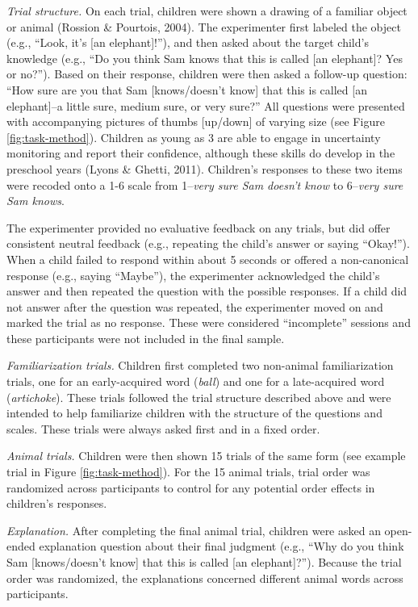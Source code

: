 \documentclass[10pt, letterpaper]{article}
\begin{document}
\emph{Trial structure.} On each trial, children were shown a drawing of
a familiar object or animal (Rossion \& Pourtois, 2004). The
experimenter first labeled the object (e.g., ``Look, it's {[}an
elephant{]}!''), and then asked about the target child's knowledge
(e.g., ``Do you think Sam knows that this is called {[}an elephant{]}?
Yes or no?''). Based on their response, children were then asked a
follow-up question: ``How sure are you that Sam {[}knows/doesn't know{]}
that this is called {[}an elephant{]}--a little sure, medium sure, or
very sure?'' All questions were presented with accompanying pictures of
thumbs {[}up/down{]} of varying size (see Figure \ref{fig:task-method}).
Children as young as 3 are able to engage in uncertainty monitoring and
report their confidence, although these skills do develop in the
preschool years (Lyons \& Ghetti, 2011). Children's responses to these
two items were recoded onto a 1-6 scale from 1--\emph{very sure Sam
doesn't know} to 6--\emph{very sure Sam knows}.

The experimenter provided no evaluative feedback on any trials, but did
offer consistent neutral feedback (e.g., repeating the child's answer or
saying ``Okay!''). When a child failed to respond within about 5 seconds
or offered a non-canonical response (e.g., saying ``Maybe''), the
experimenter acknowledged the child's answer and then repeated the
question with the possible responses. If a child did not answer after
the question was repeated, the experimenter moved on and marked the
trial as no response. These were considered ``incomplete'' sessions and
these participants were not included in the final sample.

\emph{Familiarization trials.} Children first completed two non-animal
familiarization trials, one for an early-acquired word (\emph{ball}) and
one for a late-acquired word (\emph{artichoke}). These trials followed
the trial structure described above and were intended to help
familiarize children with the structure of the questions and scales.
These trials were always asked first and in a fixed order.

\emph{Animal trials.} Children were then shown 15 trials of the same
form (see example trial in Figure \ref{fig:task-method}). For the 15
animal trials, trial order was randomized across participants to control
for any potential order effects in children's responses.

\emph{Explanation.} After completing the final animal trial, children
were asked an open-ended explanation question about their final judgment
(e.g., ``Why do you think Sam {[}knows/doesn't know{]} that this is
called {[}an elephant{]}?''). Because the trial order was randomized,
the explanations concerned different animal words across participants.
\end{document}
